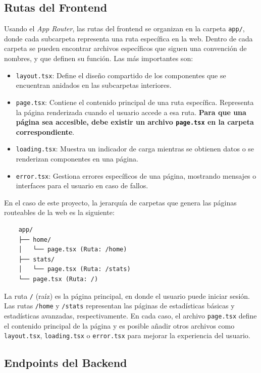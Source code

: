 \subsection{Rutas del Frontend}

Usando el \textit{App Router}, las rutas del frontend se organizan en la carpeta \texttt{app/}, donde cada subcarpeta representa una ruta específica en la web. Dentro de cada carpeta se pueden encontrar archivos específicos que siguen una convención de nombres, y que definen su función. Las más importantes son:

\begin{itemize}
    \item \texttt{layout.tsx}: Define el diseño compartido de los componentes que se encuentran anidados en las subcarpetas interiores.
    \item \texttt{page.tsx}: Contiene el contenido principal de una ruta específica. Representa la página renderizada cuando el usuario accede a esa ruta. \textbf{Para que una página sea accesible, debe existir un archivo \texttt{page.tsx} en la carpeta correspondiente}.
    \item \texttt{loading.tsx}: Muestra un indicador de carga mientras se obtienen datos o se renderizan componentes en una página.
    \item \texttt{error.tsx}: Gestiona errores específicos de una página, mostrando mensajes o interfaces para el usuario en caso de fallos.
\end{itemize}

En el caso de este proyecto, la jerarquía de carpetas que genera las páginas routeables de la web es la siguiente:

\begin{verbatim}
    app/
    ├── home/
    │   └── page.tsx (Ruta: /home)
    ├── stats/
    │   └── page.tsx (Ruta: /stats)
    └── page.tsx (Ruta: /)
\end{verbatim}

La ruta \texttt{/} (raíz) es la página principal, en donde el usuario puede iniciar sesión. Las rutas \texttt{/home} y \texttt{/stats} representan las páginas de estadísticas básicas y estadísticas avanzadas, respectivamente. En cada caso, el archivo \texttt{page.tsx} define el contenido principal de la página y es posible añadir otros archivos como \texttt{layout.tsx}, \texttt{loading.tsx} o \texttt{error.tsx} para mejorar la experiencia del usuario.

\subsection{Endpoints del Backend}

